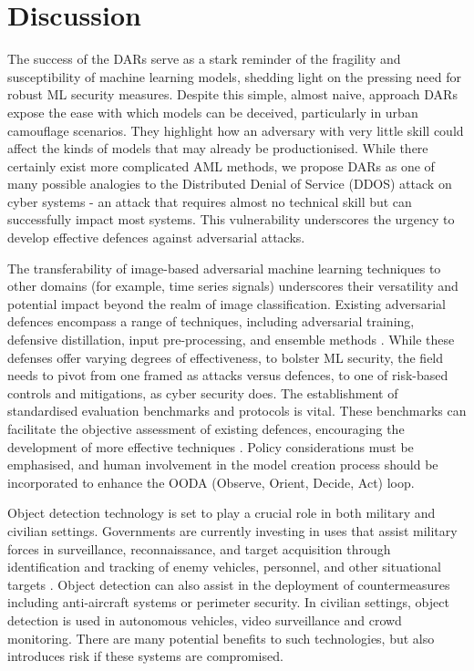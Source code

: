 \documentclass{article}
\begin{document}
\section{Discussion}
The success of the DARs serve as a stark reminder of the fragility and susceptibility of machine learning models, shedding light on the pressing need for robust ML security measures. Despite this simple, almost naive, approach DARs expose the ease with which models can be deceived, particularly in urban camouflage scenarios. They highlight how an adversary with very little skill could affect the kinds of models that may already be productionised. While there certainly exist more complicated AML methods, we propose DARs as one of many possible analogies to the Distributed Denial of Service (DDOS) attack on cyber systems - an attack that requires almost no technical skill but can successfully impact most systems. This vulnerability underscores the urgency to develop effective defences against adversarial attacks.

The transferability of image-based adversarial machine learning techniques to other domains (for example, time series signals) underscores their versatility and potential impact beyond the realm of image classification. Existing adversarial defences encompass a range of techniques, including adversarial training, defensive distillation, input pre-processing, and ensemble methods \cite{noauthor_survey_nodate}. While these defenses offer varying degrees of effectiveness, to bolster ML security, the field needs to pivot from one framed as attacks versus defences, to one of risk-based controls and mitigations, as cyber security does. The establishment of standardised evaluation benchmarks and protocols is vital. These benchmarks can facilitate the objective assessment of existing defences, encouraging the development of more effective techniques \cite{siddiqui_benchmarking_2020}. Policy considerations must be emphasised, and human involvement in the model creation process should be incorporated to enhance the OODA (Observe, Orient, Decide, Act) loop.

Object detection technology is set to play a crucial role in both military and civilian settings. Governments are currently investing in uses that assist military forces in surveillance, reconnaissance, and target acquisition through identification and tracking of enemy vehicles, personnel, and other situational targets \cite{noauthor_attacking_nodate}. Object detection can also assist in the deployment of countermeasures including anti-aircraft systems or perimeter security. In civilian settings, object detection is used in autonomous vehicles, video surveillance and crowd monitoring\cite{noauthor_attacking_nodate}. There are many potential benefits to such technologies, but also introduces risk if these systems are compromised.  
\end{document}
